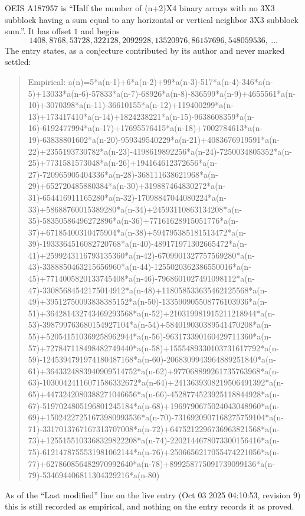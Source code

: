 \documentclass[11pt,a4paper]{article}
\theoremstyle{plain}
\theoremstyle{definition}
\begin{document}
OEIS A187957 is ``Half the number of (n+2)X4 binary arrays with no 3X3 subblock having a sum equal to any horizontal or vertical neighbor 3X3 subblock sum.''. It has offset $1$ and begins
\[
1408, 8768, 53728, 322128, 2092928, 13520976, 86157696, 548059536,\ \dots
\]
The entry states, as a conjecture contributed by its author and never marked settled:
\begin{quote}
Empirical: a(n)=5*a(n-1)+6*a(n-2)+99*a(n-3)-517*a(n-4)-346*a(n-5)+13033*a(n-6)-57833*a(n-7)-68926*a(n-8)-836599*a(n-9)+4655561*a(n-10)+3070398*a(n-11)-36610155*a(n-12)+119400299*a(n-13)+173417410*a(n-14)+1824238221*a(n-15)-9638608359*a(n-16)-6192477994*a(n-17)+17695576415*a(n-18)+7002784613*a(n-19)-63838801602*a(n-20)-959349540229*a(n-21)+4083676919591*a(n-22)+2355193730782*a(n-23)-4198619892256*a(n-24)-7250034805352*a(n-25)+7731581573048*a(n-26)+194164612372656*a(n-27)-720965905404336*a(n-28)-368111638621968*a(n-29)+652720485880384*a(n-30)+319887464830272*a(n-31)-654416911165280*a(n-32)-17098847044080224*a(n-33)+58688760015389280*a(n-34)+24593110863134208*a(n-35)-58350586496272896*a(n-36)+77161628915051776*a(n-37)+67185400310475904*a(n-38)+594795385181513472*a(n-39)-1933364516082720768*a(n-40)-489171971302665472*a(n-41)+2599243116793135360*a(n-42)-6709901327757569280*a(n-43)-3388850463215656960*a(n-44)-1255020362386550016*a(n-45)+7714005820133745408*a(n-46)-7968601027491098112*a(n-47)-33085684542175014912*a(n-48)+118058533635462125568*a(n-49)+39512750093838385152*a(n-50)-133590905508776103936*a(n-51)+364281432743469293568*a(n-52)+210319981915211218944*a(n-53)-398799763680154927104*a(n-54)+584019030389541470208*a(n-55)+520541510369258962944*a(n-56)-963173390160429711360*a(n-57)+727847118498482749440*a(n-58)+1555489330103731617792*a(n-59)-1245394791974180487168*a(n-60)-2068309943964889251840*a(n-61)+3643324883940909514752*a(n-62)+977068899261735763968*a(n-63)-10300424116071586332672*a(n-64)+2413639308219506491392*a(n-65)+4473242080388271046656*a(n-66)-4528774523925118844928*a(n-67)-5197024805196801245184*a(n-68)+1969790675024043048960*a(n-69)+15024227251673980993536*a(n-70)-7316920907168275759104*a(n-71)-3317013767167313707008*a(n-72)+6475212296736963821568*a(n-73)+1255155103368329822208*a(n-74)-2202144678073300156416*a(n-75)-6121478755531981062144*a(n-76)+2506656217055474221056*a(n-77)+627860856482970992640*a(n-78)+899258775091739099136*a(n-79)-534694406811304329216*a(n-80)
\end{quote}
As of the ``Last modified'' line on the live entry (Oct 03 2025 04:10:53, revision 9) this is still
recorded as empirical, and nothing on the entry records it as proved.
\end{document}

